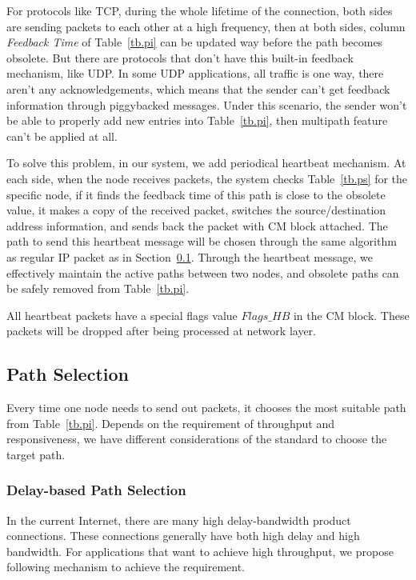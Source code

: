 For protocols like TCP, during the whole lifetime of the connection, both sides are sending packets to each other at a high frequency, then at both sides, column \emph{Feedback Time} of Table~\ref{tb.pi} can be updated way before the path becomes obsolete. But there are protocols that don't have this built-in feedback mechanism, like UDP. In some UDP applications, all traffic is one way, there aren't any acknowledgements, which means that the sender can't get feedback information through piggybacked messages. Under this scenario, the sender won't be able to properly add new entries into Table~\ref{tb.pi}, then multipath feature can't be applied at all. 

To solve this problem, in our system, we add periodical heartbeat mechanism. At each side, when the node receives packets, the system checks Table~\ref{tb.ps} for the specific node, if it finds the feedback time of this path is close to the obsolete value, it makes a copy of the received packet, switches the source/destination address information, and sends back the packet with CM block attached. The path to send this heartbeat message will be chosen through the same algorithm as regular IP packet as in Section~\ref{sec:selection}. Through the heartbeat message, we effectively maintain the active paths between two nodes, and obsolete paths can be safely removed from Table~\ref{tb.pi}. 

All heartbeat packets have a special flags value $Flags\_HB$ in the CM block. These packets will be dropped after being processed at network layer.

\subsection{Path Selection}
\label{sec:selection}

Every time one node needs to send out packets, it chooses the most suitable path from Table~\ref{tb.pi}. Depends on the requirement of throughput and responsiveness, we have different considerations of the standard to choose the target path.

\subsubsection{Delay-based Path Selection}
\label{sec:delay}
In the current Internet, there are many high delay-bandwidth product connections. These connections generally have both high delay and high bandwidth. For applications that want to achieve high throughput, we propose following mechanism to achieve the requirement. 


